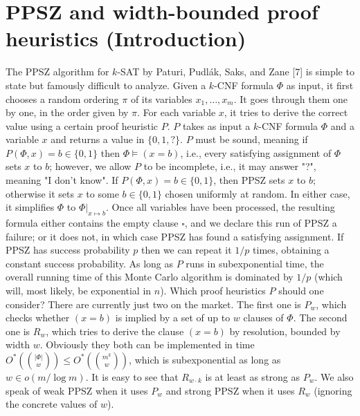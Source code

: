 \documentclass[10pt,a4paper]{article}
\begin{document}
\section*{PPSZ and width-bounded proof heuristics (Introduction)}
The PPSZ algorithm for $k$-SAT by Paturi, Pudl\'ak, Saks, and Zane [7] is simple to state but famously difficult to analyze. Given a $k$-CNF formula $\Phi$ as input, it first chooses a random ordering $\pi$ of its variables $x_1,\ldots,x_m$. It goes through them one by one, in the order given by $\pi$. For each variable $x$, it tries to derive the correct value using a certain proof heuristic $P$. $P$ takes as input a $k$-CNF formula $\Phi$ and a variable $x$ and returns a value in $\{0,1,?\}$. $P$ must be sound, meaning if $P(\Phi,x)=b\in\{0,1\}$ then $\Phi\models(x=b)$, i.e., every satisfying assignment of $\Phi$ sets $x$ to $b$; however, we allow $P$ to be incomplete, i.e., it may answer "?", meaning "I don't know". If $P(\Phi,x)=b\in\{0,1\}$, then PPSZ sets $x$ to $b$; otherwise it sets $x$ to some $b\in\{0,1\}$ chosen uniformly at random. In either case, it simplifies $\Phi$ to $\Phi|_{x\mapsto b}$. Once all variables have been processed, the resulting formula either contains the empty clause $\square$, and we declare this run of PPSZ a failure; or it does not, in which case PPSZ has found a satisfying assignment.
If PPSZ has success probability $p$ then we can repeat it $1/p$ times, obtaining a constant success probability. As long as $P$ runs in subexponential time, the overall running time of this Monte Carlo algorithm is dominated by $1/p$ (which will, most likely, be exponential in $n$). Which proof heuristics $P$ should one consider? There are currently just two on the market. The first one is $P_w$, which checks whether $(x=b)$ is implied by a set of up to $w$ clauses of $\Phi$. The second one is $R_w$, which tries to derive the clause $(x=b)$ by resolution, bounded by width $w$. Obviously they both can be implemented in time $O^*(\binom{|\Phi|}{w})\le O^*(\binom{m^k}{w})$, which is subexponential as long as $w\in o(m/\log m)$. It is easy to see that $R_{w\cdot k}$ is at least as strong as $P_w$. We also speak of weak PPSZ when it uses $P_w$ and strong PPSZ when it uses $R_w$ (ignoring the concrete values of $w$).
\end{document}
